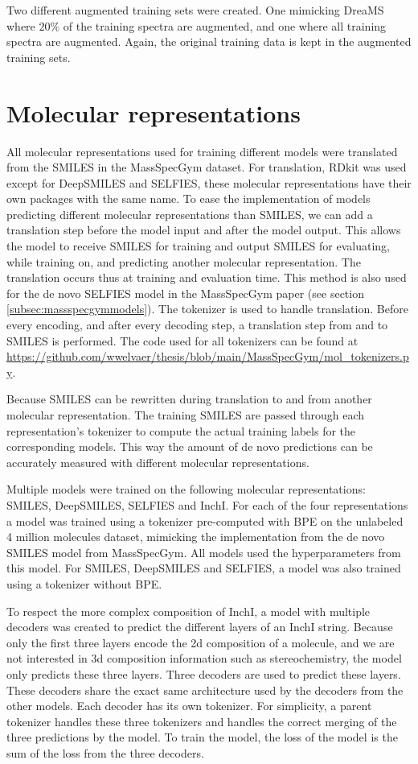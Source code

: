 Two different augmented training sets were created. One mimicking DreaMS where $20\%$ of the training spectra are augmented, and one where all training spectra are augmented.
Again, the original training data is kept in the augmented training sets.

\section{Molecular representations}
\label{sec:representations}

All molecular representations used for training different models were translated from the SMILES in the MassSpecGym dataset.
For translation, RDkit was used except for DeepSMILES and SELFIES, these molecular representations have their own packages with the same name.
To ease the implementation of models predicting different molecular representations than SMILES,
we can add a translation step before the model input and after the model output.
This allows the model to receive SMILES for training and output SMILES for evaluating,
while training on, and predicting another molecular representation.
The translation occurs thus at training and evaluation time.
This method is also used for the de novo SELFIES model in the MassSpecGym paper (see section \ref{subsec:massspecgymmodels}).
The tokenizer is used to handle translation. Before every encoding, and after every decoding step, a translation step from and to SMILES is performed.
The code used for all tokenizers can be found at \url{https://github.com/wwelvaer/thesis/blob/main/MassSpecGym/mol_tokenizers.py}.

Because SMILES can be rewritten during translation to and from another molecular representation.
The training SMILES are passed through each representation's tokenizer to compute the actual training labels for the corresponding models.
This way the amount of de novo predictions can be accurately measured with different molecular representations.

Multiple models were trained on the following molecular representations: SMILES, DeepSMILES, SELFIES and InchI.
For each of the four representations a model was trained using a tokenizer pre-computed with \ac{BPE} on the unlabeled 4 million molecules dataset,
mimicking the implementation from the de novo SMILES model from MassSpecGym. All models used the hyperparameters from this model.
For SMILES, DeepSMILES and SELFIES, a model was also trained using a tokenizer without \ac{BPE}.

To respect the more complex composition of InchI, a model with multiple decoders was created to predict the different layers of an InchI string.
Because only the first three layers encode the 2d composition of a molecule, and we are not interested in 3d composition information such as stereochemistry,
the model only predicts these three layers.
Three decoders are used to predict these layers. These decoders share the exact same architecture used by the decoders from the other models.
Each decoder has its own tokenizer. For simplicity, a parent tokenizer handles these three tokenizers and handles the correct merging of the three predictions by the model.
To train the model, the loss of the model is the sum of the loss from the three decoders.
